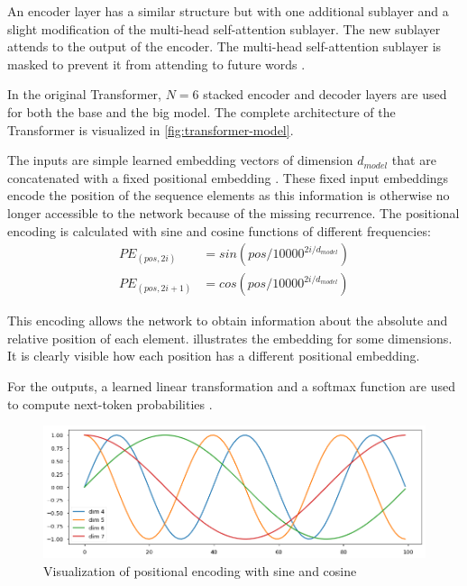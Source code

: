 An encoder layer has a similar structure but with one additional sublayer and a slight modification of the multi-head self-attention sublayer.
The new sublayer attends to the output of the encoder.
The multi-head self-attention sublayer is masked to prevent it from attending to future words \cite[p.~3]{1706.03762}.

In the original Transformer, $N = 6$ stacked encoder and decoder layers are used for both the base and the big model.
The complete architecture of the Transformer is visualized in \cref{fig:transformer-model}.

The inputs are simple learned embedding vectors of dimension $d_{model}$ that are concatenated with a fixed positional embedding \cite[p.~5--6]{1706.03762}.
These fixed input embeddings encode the position of the sequence elements as this information is otherwise no longer accessible to the network because of the missing recurrence.
The positional encoding is calculated with sine and cosine functions of different frequencies:
\begin{align*} 
	PE_{(pos,2i)} & = sin(pos/10000^{2i/d_{model}}) \\
	PE_{(pos,2i+1)} & = cos(pos/10000^{2i/d_{model}})
\end{align*}

This encoding allows the network to obtain information about the absolute and relative position of each element.
 illustrates the embedding for some dimensions.
It is clearly visible how each position has a different positional embedding.

For the outputs, a learned linear transformation and a softmax function are used to compute next-token probabilities \cite[p.~5]{1706.03762}.

\begin{figure}[h]
\centering
\includegraphics[width=0.7\paperwidth]{figures/positional-encoding-sine-cosine}
\caption[Visualization of positional encoding with sine and cosine]{Visualization of positional encoding with sine and cosine \cite{annotated.transformer}}
\label{fig:positional-encoding-sine-cosine}
\end{figure}

